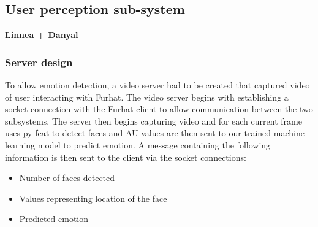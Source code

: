 \documentclass[conference]{IEEEtran}
\begin{document}
\subsection{User perception sub-system}
\textbf{Linnea + Danyal}
\subsubsection{Server design}\label{sec:serverdesign}
To allow emotion detection, a video server had to be created that captured video of user interacting with Furhat. The video server begins with establishing a socket connection with the Furhat client to allow communication between the two subsystems. The server then begins capturing video and for each current frame uses py-feat to detect faces and AU-values are then sent to our trained machine learning model to predict emotion. A message containing the following information is then sent to the client via the socket connections:
\begin{itemize}
    \item Number of faces detected
    \item Values representing location of the face
    \item Predicted emotion
\end{itemize}
\end{document}
